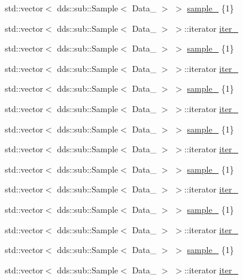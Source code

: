 \begin{DoxyCompactItemize}
\item 
std\+::vector$<$ dds\+::sub\+::\+Sample$<$ Data\+\_ $>$ $>$ \hyperlink{classFusion__operator_a1a65f84d529180cd77defee525bc7bd6}{sample\+\_} \{1\}
\item 
std\+::vector$<$ dds\+::sub\+::\+Sample$<$ Data\+\_ $>$ $>$\+::iterator \hyperlink{classFusion__operator_a4fd31cb3bea3e7362643729b4bdcb3f1}{iter\+\_}
\item 
std\+::vector$<$ dds\+::sub\+::\+Sample$<$ Data\+\_ $>$ $>$ \hyperlink{classFusion__operator_a1954d8d67f9a34d47e5b59cc65d09252}{sample\+\_} \{1\}
\item 
std\+::vector$<$ dds\+::sub\+::\+Sample$<$ Data\+\_ $>$ $>$\+::iterator \hyperlink{classFusion__operator_a15048a8432350604c31fbbd6945d4692}{iter\+\_}
\item 
std\+::vector$<$ dds\+::sub\+::\+Sample$<$ Data\+\_ $>$ $>$ \hyperlink{classFusion__operator_a56bb3464ca6d140acdf3560bb94a401b}{sample\+\_} \{1\}
\item 
std\+::vector$<$ dds\+::sub\+::\+Sample$<$ Data\+\_ $>$ $>$\+::iterator \hyperlink{classFusion__operator_a98de1068d698554103ec8b77a012df5b}{iter\+\_}
\item 
std\+::vector$<$ dds\+::sub\+::\+Sample$<$ Data\+\_ $>$ $>$ \hyperlink{classFusion__operator_a5623c0acc7a90d21a50ac010a5f1daf5}{sample\+\_} \{1\}
\item 
std\+::vector$<$ dds\+::sub\+::\+Sample$<$ Data\+\_ $>$ $>$\+::iterator \hyperlink{classFusion__operator_a323bf6a71abd728d9ef6daa5ed1b1ab2}{iter\+\_}
\item 
std\+::vector$<$ dds\+::sub\+::\+Sample$<$ Data\+\_ $>$ $>$ \hyperlink{classFusion__operator_a0051d8d0ba3e16b797e38412e44f46ef}{sample\+\_} \{1\}
\item 
std\+::vector$<$ dds\+::sub\+::\+Sample$<$ Data\+\_ $>$ $>$\+::iterator \hyperlink{classFusion__operator_a38913c414f92a70db936c629ddfb4fb0}{iter\+\_}
\item 
std\+::vector$<$ dds\+::sub\+::\+Sample$<$ Data\+\_ $>$ $>$ \hyperlink{classFusion__operator_ac206ae8fc1c89e2ca114bb80a5899bcd}{sample\+\_} \{1\}
\item 
std\+::vector$<$ dds\+::sub\+::\+Sample$<$ Data\+\_ $>$ $>$\+::iterator \hyperlink{classFusion__operator_a010f79ae83cd86608e81475c4b021104}{iter\+\_}
\item 
std\+::vector$<$ dds\+::sub\+::\+Sample$<$ Data\+\_ $>$ $>$ \hyperlink{classFusion__operator_ad74fbf7634ca557dc8e590487b21b283}{sample\+\_} \{1\}
\item 
std\+::vector$<$ dds\+::sub\+::\+Sample$<$ Data\+\_ $>$ $>$\+::iterator \hyperlink{classFusion__operator_a472aa52f1d6fb1646283d5d955a13ae1}{iter\+\_}
\end{DoxyCompactItemize}


